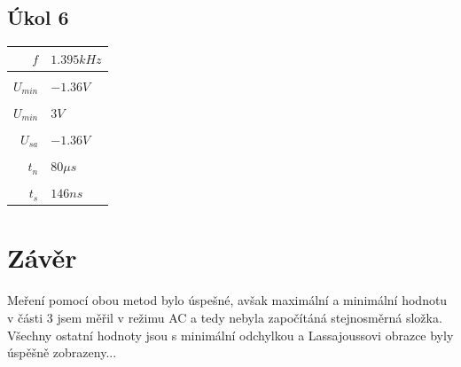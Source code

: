 \documentclass[5pt]{article}
\begin{document}
\subsection{Úkol 6}
\begin{tabular}{r|l}
	$ f $ & $ 1.395 kHz $\\ \hline \\
	$ U_{min} $ & $ -1.36 V $\\ \hline \\
	$ U_{min} $ & $ 3 V $\\ \hline \\
	$ U_{sa} $ & $ -1.36 V $\\ \hline \\
	$ t_n $ & $ 80 \mu s $ \\ \hline \\
	$ t_s $ & $ 146 ns $ \\
\end{tabular}

\section{Závěr}
Meření pomocí obou metod bylo úspešné, avšak maximální a minimální hodnotu v části 3 jsem měřil v režimu AC a tedy nebyla započítáná stejnosměrná složka. Všechny ostatní hodnoty jsou s minimální odchylkou a Lassajoussovi obrazce byly úspěšně zobrazeny...
\end{document}
